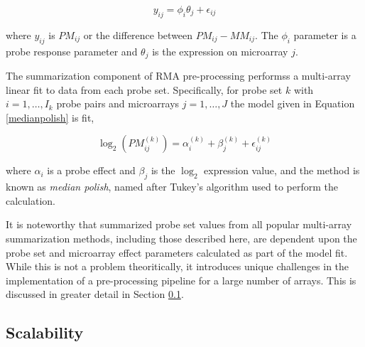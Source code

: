 \begin{equation}
\label{mbeisummary}
y_{ij} = \phi_i \theta_j + \epsilon_{ij}
\end{equation}

where $y_{ij}$ is $PM_{ij}$ or the difference between $PM_{ij}-MM_{ij}$. The
$\phi_i$ parameter is a probe response parameter and $\theta_j$ is the
expression on microarray $j$.

The summarization component of RMA pre-processing \cite{rma} performss a
multi-array linear fit to data from each probe set.  Specifically, for probe
set $k$ with $i=1,\dots,I_k$ probe pairs and microarrays $j=1,\dots,J$ the
model given in Equation \ref{medianpolish} is fit,

\begin{equation}
\label{medianpolish}
\log_2\left(PM^{(k)}_{ij}\right) = \alpha_i^{(k)} + \beta_j^{(k)} + \epsilon_{ij}^{(k)}
\end{equation}

where $\alpha_i$ is a probe effect and $\beta_j$ is the $\log_2$ expression
value, and the method is known as \emph{median polish}, named after Tukey's
algorithm used to perform the calculation.

It is noteworthy that summarized probe set values from all popular multi-array
summarization methods, including those described here, are dependent upon the
probe set and microarray effect parameters calculated as part of the model fit.
While this is not a problem theoritically, it introduces unique challenges in
the implementation of a pre-processing pipeline for a large number of arrays.
This is discussed in greater detail in Section \ref{Scalability}.

\subsection{Scalability}\label{Scalability}


